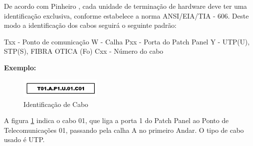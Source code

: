 \documentclass[	DIV=calc,%
paper=a4,%
fontsize=12pt,%
onecolumn]{scrartcl}	 					%
\begin{document}
	De acordo com Pinheiro \cite{ref2}, cada unidade de terminação de hardware deve ter uma identificação exclusiva, conforme estabelece a norma ANSI/EIA/TIA - 606. Deste modo a identificação dos cabos seguirá o seguinte padrão:
	
	\subitem Txx - Ponto de comunicação
	\subitem W - Calha
	\subitem Pxx - Porta do Patch Panel
	\subitem Y - UTP(U), STP(S), FIBRA OTICA (Fo)
	\subitem Cxx - Número do cabo
	
	
    \textbf{Exemplo:} 
    
	\begin{figure}[h]
		\centering
		
		\includegraphics[width=4cm]{fig4}
		\caption{Identificação de Cabo}
		\label{fig4}
	\end{figure}
	A figura \ref{fig4} indica o cabo 01, que liga a porta 1 do Patch Panel ao Ponto de Telecomunicações 01, passando pela calha A no primeiro Andar. O tipo de cabo usado é UTP.
\clearpage	
\end{document}

